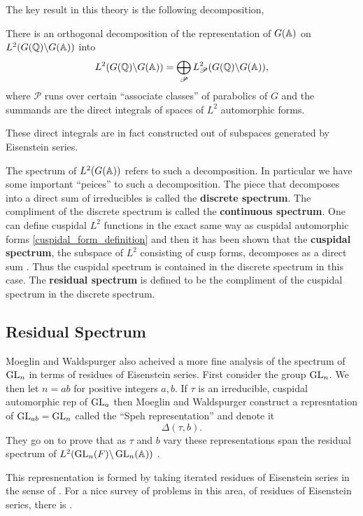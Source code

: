 The key result in this theory is the following decomposition,
\begin{Theorem}
    There is an orthogonal decomposition of the representation of \(G(\A)\) on \(L^2(G(\Q) \backslash G(\A))\) into 
    \[L^2(G(\Q) \backslash G(\A)) = \bigoplus_{\mathscr{P}}L^2_\mathscr{P}(G(\Q) \backslash G(\A)),\]
    where \(\mathscr{P}\) runs over certain ``associate classes'' of parabolics of \(G\) and the summands are the direct integrals of spaces of \(L^2\) automorphic forms.
\end{Theorem}
These direct integrals are in fact constructed out of subspaces generated by Eisenstein series. 

The spectrum of \(L^2(G(\A))\) refers to such a decomposition. In particular we have some important ``peices'' to such a decomposition. The piece that decomposes into a direct sum of irreducibles is called the \textbf{discrete spectrum}. The compliment of the discrete spectrum is called the \textbf{continuous spectrum}. One can define cuspidal \(L^2\) functions in the exact same way as cuspidal automorphic forms \ref{cuspidal_form_definition} and then it has been shown that the \textbf{cuspidal spectrum}, the subspace of \(L^2\) consisting of cusp forms, decomposes as a direct sum \cite[9]{getzIntroductionAutomorphicRepresentations2024}. Thus the cuspidal spectrum is contained in the discrete spectrum in this case. The \textbf{residual spectrum} is defined to be the compliment of the cuspidal spectrum in the discrete spectrum.

\subsection{Residual Spectrum}
Moeglin and Waldspurger also acheived a more fine analysis of the spectrum of \(\operatorname{GL}_n\) in terms of residues of Eisenstein series. 
First consider the group \(\operatorname{GL}_n\). We then let \(n = ab\) for positive integers \(a,b\). If \(\tau\) is an irreducible, cuspidal automorphic rep of \(\operatorname{GL}_a\) then Moeglin and Waldspurger construct a represntation of \(\operatorname{GL}_{ab} = \operatorname{GL}_n\) called the ``Speh representation'' and denote it 
\[\Delta(\tau, b).\]
They go on to prove that as \(\tau\) and \(b\) vary these representations span the residual spectrum of \(L^2(\GL_n(F) \backslash \GL_n(\A))\) \cite[Thm. 1.1]{jiangPolesCertainResidual2013}.

This represnentation is formed by taking iterated residues of Eisenstein series in the sense of \cite[V]{moeglinSpectralDecompositionEisenstein1995}. For a nice survey of problems in this area, of residues of Eisenstein series, there is \cite{jiangResiduesEisensteinSeries2008a}.



